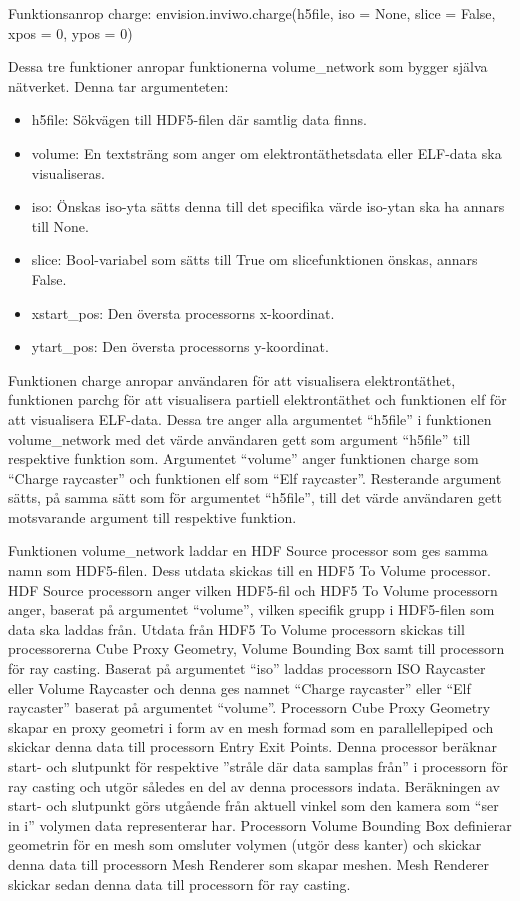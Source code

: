 \documentclass[a4paper,12pt]{article}
\begin{document}
Funktionsanrop charge: \newline
envision.inviwo.charge(h5file, iso = None,
slice = False, xpos = 0, ypos = 0)

Dessa tre funktioner anropar funktionerna volume\_network som bygger själva nätverket. Denna tar argumenteten:

\begin{itemize}
\item h5file: Sökvägen till HDF5-filen där samtlig data finns.
\item volume: En textsträng som anger om elektrontäthetsdata eller ELF-data ska visualiseras.
\item iso: Önskas iso-yta sätts denna till det specifika värde iso-ytan ska ha annars till None.
\item slice: Bool-variabel som sätts till True om slicefunktionen önskas, annars False.
\item xstart\_pos: Den översta processorns x-koordinat.
\item ytart\_pos: Den översta processorns y-koordinat.
\end{itemize}

Funktionen charge anropar användaren för att visualisera elektrontäthet, funktionen parchg för att visualisera partiell elektrontäthet och funktionen elf för att visualisera ELF-data. Dessa tre anger alla argumentet ``h5file” i funktionen volume\_network 
med det värde användaren gett som argument 
``h5file” till respektive funktion som. Argumentet ``volume” anger funktionen charge som ``Charge raycaster” och funktionen elf som ``Elf raycaster”. 
Resterande argument sätts, på samma sätt som för argumentet ``h5file”, till det värde användaren gett motsvarande argument till respektive funktion.

Funktionen volume\_network laddar en HDF Source processor som ges samma namn som HDF5-filen. 
Dess utdata skickas till en HDF5 To Volume processor. HDF Source processorn anger vilken HDF5-fil och HDF5 To Volume processorn anger, baserat på argumentet ``volume”,
vilken specifik grupp i HDF5-filen som data ska laddas från. Utdata från HDF5 To Volume processorn skickas till processorerna Cube Proxy Geometry, Volume Bounding Box samt till processorn för ray casting. Baserat på 
argumentet ``iso” laddas processorn ISO Raycaster eller Volume Raycaster och denna ges namnet 
``Charge raycaster” eller ``Elf raycaster” baserat på argumentet ``volume”. Processorn Cube Proxy 
Geometry skapar en proxy geometri i form av en mesh formad som en parallellepiped
och skickar denna data till processorn Entry Exit Points. Denna processor beräknar start- och slutpunkt för respektive ”stråle där data samplas från” i processorn för ray casting och utgör således en del av denna processors indata. Beräkningen av start- och slutpunkt görs utgående från aktuell vinkel som den 
kamera som ``ser in i” volymen data representerar har. Processorn Volume Bounding Box definierar 
geometrin för en mesh som omsluter volymen (utgör dess kanter) och skickar denna data till 
processorn Mesh Renderer som skapar meshen. Mesh Renderer skickar sedan denna data till 
processorn för ray casting.
\end{document}
